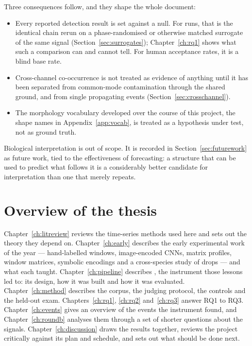 Three consequences follow, and they shape the whole document:
\begin{itemize}
  \item Every reported detection result is set against a null. For runs, that is the identical chain rerun on a phase-randomised or otherwise matched surrogate of the same signal (Section~\ref{sec:surrogates}); Chapter~\ref{ch:rq1} shows what such a comparison can and cannot tell. For human acceptance rates, it is a blind base rate.
  \item Cross-channel co-occurrence is not treated as evidence of anything until it has been separated from common-mode contamination through the shared ground, and from single propagating events (Section~\ref{sec:crosschannel}).
  \item The morphology vocabulary developed over the course of this project, the shape names in Appendix~\ref{app:vocab}, is treated as a hypothesis under test, not as ground truth.
\end{itemize}

Biological interpretation is out of scope. It is recorded in Section~\ref{sec:futurework} as future work, tied to the effectiveness of forecasting: a structure that can be used to predict what follows it is a considerably better candidate for interpretation than one that merely repeats.

\section{Overview of the thesis}

Chapter~\ref{ch:litreview} reviews the time-series methods used here and sets out the theory they depend on. Chapter~\ref{ch:early} describes the early experimental work of the year --- hand-labelled windows, image-encoded CNNs, matrix profiles, window matrices, symbolic encodings and a cross-species study of drops --- and what each taught. Chapter~\ref{ch:pipeline} describes \tool{}, the instrument those lessons led to: its design, how it was built and how it was evaluated. Chapter~\ref{ch:method} describes the corpus, the judging protocol, the controls and the held-out exam. Chapters~\ref{ch:rq1}, \ref{ch:rq2} and~\ref{ch:rq3} answer RQ1 to RQ3. Chapter~\ref{ch:events} gives an overview of the events the instrument found, and Chapter~\ref{ch:roundb} analyses them through a set of shorter questions about the signals. Chapter~\ref{ch:discussion} draws the results together, reviews the project critically against its plan and schedule, and sets out what should be done next.
